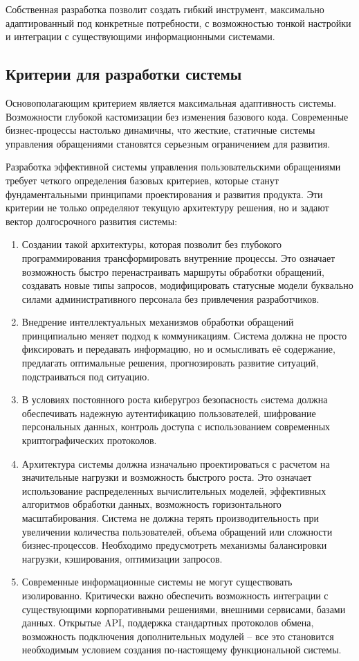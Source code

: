 Собственная разработка позволит создать гибкий инструмент, максимально адаптированный под конкретные потребности, с возможностью тонкой настройки и интеграции с существующими информационными системами.

\subsection{Критерии для разработки системы}

Основополагающим критерием является максимальная адаптивность системы. Возможности глубокой кастомизации без изменения базового кода. Современные бизнес-процессы настолько динамичны, что жесткие, статичные системы управления обращениями становятся серьезным ограничением для развития.

Разработка эффективной системы управления пользовательскими обращениями требует четкого определения базовых критериев, которые станут фундаментальными принципами проектирования и развития продукта. Эти критерии не только определяют текущую архитектуру решения, но и задают вектор долгосрочного развития системы:

\begin{enumerate}[label=\arabic*.]
    \item Создании такой архитектуры, которая позволит без глубокого программирования трансформировать внутренние процессы. Это означает возможность быстро перенастраивать маршруты обработки обращений, создавать новые типы запросов, модифицировать статусные модели буквально силами административного персонала без привлечения разработчиков.
    \item Внедрение интеллектуальных механизмов обработки обращений принципиально меняет подход к коммуникациям. Система должна не просто фиксировать и передавать информацию, но и осмысливать её содержание, предлагать оптимальные решения, прогнозировать развитие ситуаций, подстраиваться под ситуацию.
    \item В условиях постоянного роста киберугроз безопасность cистема должна обеспечивать надежную аутентификацию пользователей, шифрование персональных данных, контроль доступа с использованием современных криптографических протоколов.
    \item Архитектура системы должна изначально проектироваться с расчетом на значительные нагрузки и возможность быстрого роста. Это означает использование распределенных вычислительных моделей, эффективных алгоритмов обработки данных, возможность горизонтального масштабирования. Система не должна терять производительность при увеличении количества пользователей, объема обращений или сложности бизнес-процессов. Необходимо предусмотреть механизмы балансировки нагрузки, кэширования, оптимизации запросов.
    \item Современные информационные системы не могут существовать изолированно. Критически важно обеспечить возможность интеграции с существующими корпоративными решениями, внешними сервисами, базами данных. Открытые API, поддержка стандартных протоколов обмена, возможность подключения дополнительных модулей – все это становится необходимым условием создания по-настоящему функциональной системы.
\end{enumerate}

